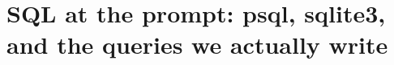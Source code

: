 \chapter{SQL at the prompt: psql, sqlite3, and the queries we actually write}
\label{ch:sql-at-the-prompt-psql-sqlite3-and-the}

